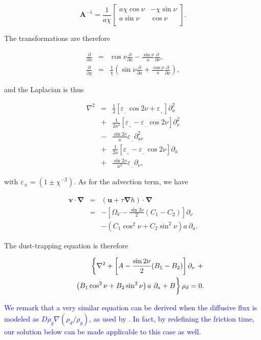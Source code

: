 \documentclass[apj]{emulateapj}
\newcommand{\pderiv}[2]{\frac{\partial #1}{\partial #2}}
\newcommand{\vt}[1]{\mathbf{#1}}       %
\renewcommand{\v}[1]{{\boldsymbol{#1}}} %
\def\white#1{\textcolor{white}{#1}}
\def\blue#1{\textcolor{blue}{#1}}
\newcommand{\del}{\v{\nabla}}
\newcommand{\grad}{\del}
\newcommand{\Laplace}{\nabla^2}
\newcommand{\beq}{\begin{equation}}
\newcommand{\eeq}{\end{equation}}
\newcommand{\beqn}{\begin{eqnarray}}
\newcommand{\eeqn}{\end{eqnarray}}
\newcommand{\epsp}{\varepsilon_{_{+}}}
\newcommand{\epsm}{\varepsilon_{_{-}}}
\begin{document}
\beq
\vt{A}^{-1} = \frac{1}{a\chi} \left[\begin{array}{cc}
a\chi\cos\nu  & -\chi\sin\nu  \\
a\sin\nu  & \cos\nu \\
\end{array}\right].  
\eeq

The transformations are therefore

\beqn
\pderiv{}{x} &=& \cos\nu \pderiv{}{a} - \frac{\sin\nu}{a} \pderiv{}{\nu}, \\
\pderiv{}{y} &=& \frac{1}{\chi}\left(\sin\nu \pderiv{}{a} + \frac{\cos\nu}{a} \pderiv{}{\nu} \right),
\eeqn

\noindent and the Laplacian is thus 

\beqn
\Laplace{} &= &\frac{1}{2}\left[ \epsm \cos 2\nu +  \epsp\right] \partial^2_a  \nonumber \\
                &+& \frac{1}{2a^2}\left[ \epsp - \epsm \cos 2\nu\right] \partial^2_\nu \nonumber \\
                &-& \frac{\sin 2\nu}{a}\epsm \partial^2_{a\nu}   \nonumber \\
                &+& \frac{1}{2a}\left[ \epsp - \epsm \cos 2\nu\right] \partial_a \nonumber \\
                &+& \frac{\sin 2\nu}{a^2} \epsm\partial_\nu, \label{eq:laplace}
\eeqn

\noindent with $\varepsilon_{\pm} = (1 \pm \chi^{-2})$.  As for the advection term, we have 

\beqn
\v{v}\cdot\del &=& (\v{u} + \tau \grad h) \cdot \del \nonumber \\
&=& - \left[\varOmega_V - \frac{\sin2\nu}{2}  (C_1 -  C_2)\right]\partial_\nu \nonumber \\
&&- \left( C_1 \cos^2\nu   + C_2\sin^2\nu \right) a \ \partial_a. \label{eq:advection-term}
\eeqn

The dust-trapping equation is therefore 

\beqn 
&& \left\{ \Laplace{} + \left[A - \frac{\sin2\nu}{2}  (B_1 - B_2)\right]\partial_\nu \ +  \right.  \nonumber\\
&& \left. \white{\frac{1}{1}}\left( B_1 \cos^2\nu   + B_2\sin^2\nu
  \right) a \ \partial_a  + B \right\} \rho_d = 0. \label{eq:dust-trapping-uvzero}
\eeqn

\blue{We remark that a very similar equation  can be derived  when the diffusive flux is modeled as $D\rho_g\nabla(\rho_d/\rho_g)$, as used by \cite{Birnstiel13} . In fact, by redefining the friction time, 
our solution below can be made applicable to this case as well.} 
\end{document}
